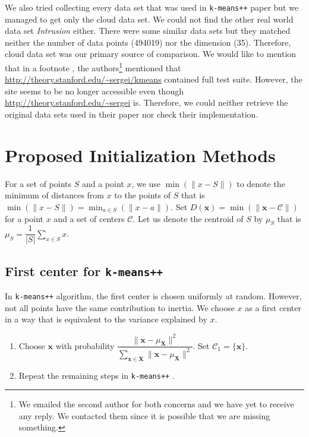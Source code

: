 \documentclass[twoside, 11pt]{article}
\newcommand{\x}{\mathbf{x}}
\newcommand{\X}{\mathbf{X}}
\newcommand{\C}{\mathcal{C}}
\begin{document}
	We also tried collecting every data set that was used in \texttt{k-means++} paper but we managed to get only the cloud data set. We could not find the other real world data set \textit{Intrusion} either. There were some similar data sets but they matched neither the number of data points (494019) nor the dimension (35). Therefore, cloud data set was our primary source of comparison. We would like to mention that in a footnote \citep[Section $6$, page $8$]{kmeans++}, the authors\footnote{We emailed the second author for both concerns and we have yet to receive any reply. We contacted them since it is possible that we are missing something.} mentioned that \url{http://theory.stanford.edu/~sergei/kmeans} contained full test suite. However, the site seems to be no longer accessible even though \url{http://theory.stanford.edu/~sergei} is. Therefore, we could neither retrieve the original data sets used in their paper nor check their implementation.
	\section{Proposed Initialization Methods}
	For a set of points $S$ and a point $x$, we use $\min(\|x-S\|)$ to denote the minimum of distances from $x$ to the points of $S$ that is $\min(\| x-S\|)=\min_{a\in S}(\| x-a\|)$. Set $D(\x)=\min(\|\x-\C\|)$ for a point $x$ and a set of centers $\C$. Let us denote the centroid of $S$ by $\mu_S$ that is $\mu_S=\dfrac{1}{|S|}\sum_{x\in S}x$.
	\subsection{First center for \texttt{k-means++}}\label{sec:first_center}
	In \texttt{k-means++} algorithm, the first center is chosen uniformly at random. However, not all points have the same contribution to inertia. We choose $x$ as a first center in a way that is equivalent to the variance explained by $x$.
	\begin{enumerate}[i]
		\item Choose $\x$ with probability $\dfrac{\|\x-\mu_{\X}\|^2}{\sum_{\x\in\X}\|\x-\mu_{\X}\|^2}$. Set $\C_1=\{\x\}$.\label{step:first_center}
		\item Repeat the remaining steps in \texttt{k-means++} \cite[Section $2.2$, Page $3$]{kmeans++}.
	\end{enumerate}
\end{document}
